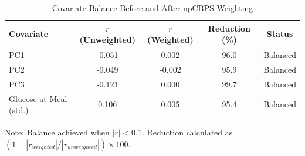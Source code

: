 \begin{table}[htbp]
\centering
\caption{Covariate Balance Before and After npCBPS Weighting}
\label{tab:balance}
\begin{tabular}{lcccc}
\toprule
Covariate & $r$ (Unweighted) & $r$ (Weighted) & Reduction (\%) & Status \\
\midrule
PC1 & -0.051 & 0.002 & 96.0 & Balanced \\
PC2 & -0.049 & -0.002 & 95.9 & Balanced \\
PC3 & -0.121 & 0.000 & 99.7 & Balanced \\
Glucose at Meal (std.) & 0.106 & 0.005 & 95.4 & Balanced \\
\bottomrule
\end{tabular}
\begin{tablenotes}
\small
\item Note: Balance achieved when $|r| < 0.1$. Reduction calculated as $(1 - |r_{weighted}|/|r_{unweighted}|) \times 100$.
\end{tablenotes}
\end{table}
